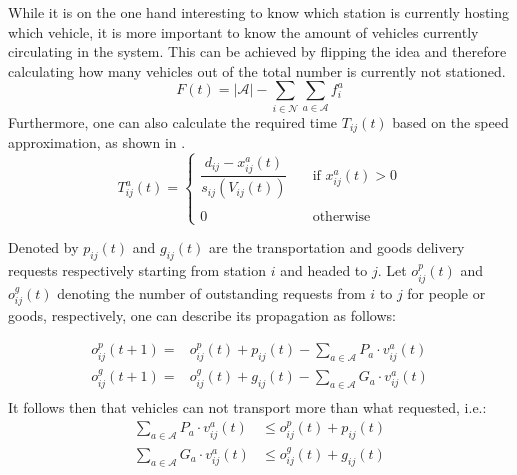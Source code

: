 While it is on the one hand interesting to know which station is currently hosting which vehicle, it is more important to know the amount of vehicles currently circulating in the system. This can be achieved by flipping the idea and therefore calculating how many vehicles out of the total number is currently not stationed. 
\begin{equation}
	F(t) = |\mathcal{A}| - \sum_{i \in\mathcal{N}}\sum_{a \in\mathcal{A}}f^a_{i}
\end{equation}
Furthermore, one can also calculate the required time $T_{ij}(t)$ based on the speed approximation, as shown in . 
\begin{equation}
	T_{ij}^a(t) = \begin{cases}
		\dfrac{d_{ij} - x^a_{ij}(t)}{s_{ij}(V_{ij}(t))} &\quad \text{if } x_{ij}^a(t) > 0\\
		&\\
		0 &\quad\text{otherwise }
	\end{cases}
	\label{eq:required_time} 
\end{equation}

Denoted by $p_{ij}(t)$ and $g_{ij}(t)$ are the transportation and goods delivery requests respectively starting from station $i$ and headed to $j$. Let $o^p_{ij}(t)$ and $o^g_{ij}(t)$ denoting the number of outstanding requests from $i$ to $j$ for people or goods, respectively, one can describe its propagation as follows:

\begin{equation}
	\begin{aligned}
		o^p_{ij}(t+1) =& o^p_{ij}(t) + p_{ij}(t) - \sum_{a \in \mathcal{A}} P_a\cdot v^a_{ij}(t)\\
			o^g_{ij}(t+1) =& o^g_{ij}(t) + g_{ij}(t) - \sum_{a \in \mathcal{A}} G_a \cdot v^a_{ij}(t)\\
	\end{aligned}
	\label{eq:demand_time}
\end{equation}
It follows then that vehicles can not transport more than what requested, i.e.:
\begin{equation}
	\begin{aligned}
	\sum_{a \in \mathcal{A}}  P_a\cdot v^a_{ij}(t) &\leq o^p_{ij}(t) + p_{ij}(t) \\
	\sum_{a \in \mathcal{A}} G_a \cdot v^a_{ij}(t) &\leq o^g_{ij}(t) + g_{ij}(t)
	\end{aligned}
	 \label{eq:no_more_than_request}
\end{equation}


